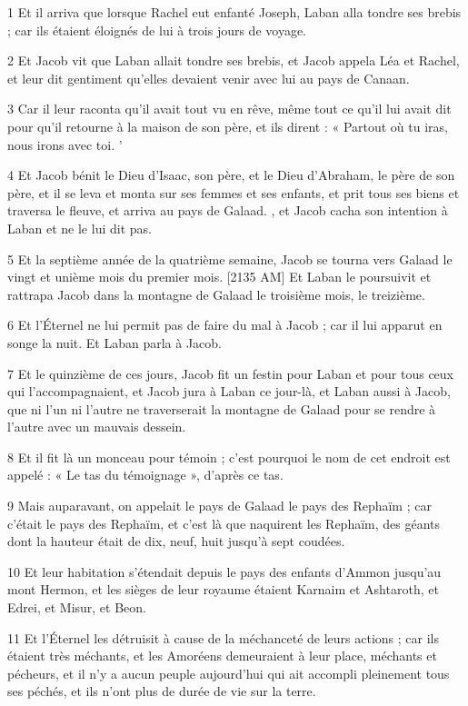 \par 1 Et il arriva que lorsque Rachel eut enfanté Joseph, Laban alla tondre ses brebis ; car ils étaient éloignés de lui à trois jours de voyage.
\par 2 Et Jacob vit que Laban allait tondre ses brebis, et Jacob appela Léa et Rachel, et leur dit gentiment qu'elles devaient venir avec lui au pays de Canaan.
\par 3 Car il leur raconta qu'il avait tout vu en rêve, même tout ce qu'il lui avait dit pour qu'il retourne à la maison de son père, et ils dirent : « Partout où tu iras, nous irons avec toi. '
\par 4 Et Jacob bénit le Dieu d'Isaac, son père, et le Dieu d'Abraham, le père de son père, et il se leva et monta sur ses femmes et ses enfants, et prit tous ses biens et traversa le fleuve, et arriva au pays de Galaad. , et Jacob cacha son intention à Laban et ne le lui dit pas.
\par 5 Et la septième année de la quatrième semaine, Jacob se tourna vers Galaad le vingt et unième mois du premier mois. [2135 AM] Et Laban le poursuivit et rattrapa Jacob dans la montagne de Galaad le troisième mois, le treizième.
\par 6 Et l'Éternel ne lui permit pas de faire du mal à Jacob ; car il lui apparut en songe la nuit. Et Laban parla à Jacob.
\par 7 Et le quinzième de ces jours, Jacob fit un festin pour Laban et pour tous ceux qui l'accompagnaient, et Jacob jura à Laban ce jour-là, et Laban aussi à Jacob, que ni l'un ni l'autre ne traverserait la montagne de Galaad pour se rendre à l'autre avec un mauvais dessein.
\par 8 Et il fit là un monceau pour témoin ; c'est pourquoi le nom de cet endroit est appelé : « Le tas du témoignage », d'après ce tas.
\par 9 Mais auparavant, on appelait le pays de Galaad le pays des Rephaïm ; car c'était le pays des Rephaïm, et c'est là que naquirent les Rephaïm, des géants dont la hauteur était de dix, neuf, huit jusqu'à sept coudées.
\par 10 Et leur habitation s'étendait depuis le pays des enfants d'Ammon jusqu'au mont Hermon, et les sièges de leur royaume étaient Karnaim et Ashtaroth, et Edrei, et Misur, et Beon.
\par 11 Et l'Éternel les détruisit à cause de la méchanceté de leurs actions ; car ils étaient très méchants, et les Amoréens demeuraient à leur place, méchants et pécheurs, et il n'y a aucun peuple aujourd'hui qui ait accompli pleinement tous ses péchés, et ils n'ont plus de durée de vie sur la terre.
